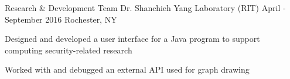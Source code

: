 \begin{cvexperiences}
	\cvexperience
	{Research \& Development Team}
		{Dr. Shanchieh Yang Laboratory (RIT)}
		{April - September 2016}
		{Rochester, NY}
		{
			\begin{cvitems}
			\item{Designed and developed a user interface for a Java program to support computing security-related research}
			\item{Worked with and debugged an external API used for graph drawing}
			\end{cvitems}
		}
\end{cvexperiences}
